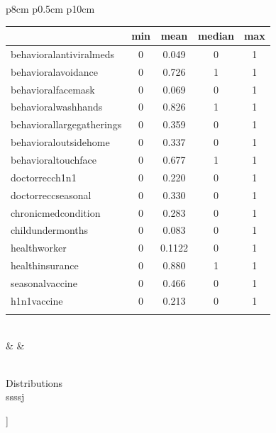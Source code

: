\documentclass{IEEEtran}
\begin{document}
\begin{@twocolumnfalse}
\begin{center}
{\begin{tabular}{p{8cm} p{0.5cm} p{10cm}}
\begin{tabular}{| l |c|c|c|c|} %
\hline 
& \textbf{min} & \textbf{mean} & \textbf{median} & \textbf{max} \\
\hline 
behavioral\textunderscore antiviral\textunderscore meds & 0 & 0.049 & 0 & 1\\
\hline
behavioral\textunderscore avoidance & 0 & 0.726 & 1 & 1\\
\hline 
behavioral\textunderscore face\textunderscore mask & 0 & 0.069 & 0 & 1\\
\hline 
behavioral\textunderscore wash\textunderscore hands & 0 & 0.826 & 1 & 1\\
\hline 
behavioral\textunderscore large\textunderscore gatherings & 0 & 0.359 & 0 & 1\\
\hline
behavioral\textunderscore outside\textunderscore home & 0 & 0.337 & 0 & 1\\
\hline 
behavioral\textunderscore touch\textunderscore face & 0 & 0.677 & 1 & 1\\
\hline 
doctor\textunderscore recc\textunderscore h1n1 & 0 & 0.220 & 0 & 1\\
\hline 
doctor\textunderscore recc\textunderscore seasonal & 0 & 0.330 & 0 & 1\\
\hline 
chronic\textunderscore med\textunderscore condition & 0 & 0.283 & 0 & 1\\
\hline 
child\textunderscore under\textunderscore 6\textunderscore months & 0 & 0.083 & 0 & 1\\
\hline
health\textunderscore worker & 0 & 0.1122 & 0 & 1\\
\hline
health\textunderscore insurance & 0 & 0.880 & 1 & 1\\
\hline
seasonal\textunderscore vaccine & 0 & 0.466 & 0 & 1\\
\hline
h1n1\textunderscore vaccine & 0 & 0.213 & 0 & 1\\
\hline
\multicolumn{4}{l}{}\\
\end{tabular}\\
& & \\
\\
\end{tabular}%
}
\end{center}
{\huge Distributions}\\
ssssj
\end{@twocolumnfalse}
]
\end{document}
